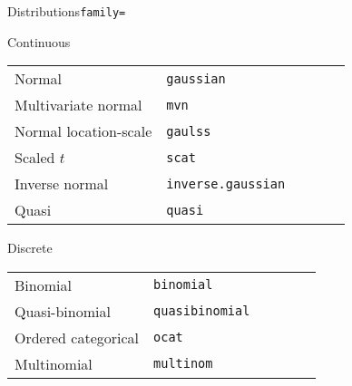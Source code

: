 
\begin{seeblock}{Distributions}{\texttt{family=}}

  \begin{subblock}{Continuous}
    \begin{tabular}{>{}m{0.45\linewidth} >{\centering\arraybackslash}m{0.55\linewidth}}
      Normal                & \texttt{gaussian}\\
      Multivariate normal   & \texttt{mvn}\\
      Normal location-scale & \texttt{gaulss}\\
      Scaled $t$            & \texttt{scat}\\
      Inverse normal        & \texttt{inverse.gaussian}\\
      Quasi                 & \texttt{quasi}\\
    \end{tabular}
  \end{subblock}

  \begin{subblock}{Discrete}
    \begin{tabular}{>{}m{0.45\linewidth} >{\centering\arraybackslash}m{0.55\linewidth}}
      Binomial            & \texttt{binomial}\\
      Quasi-binomial      & \texttt{quasibinomial}\\
      Ordered categorical & \texttt{ocat}\\
      Multinomial         & \texttt{multinom}\\
    \end{tabular}
  \end{subblock}



\end{seeblock}
